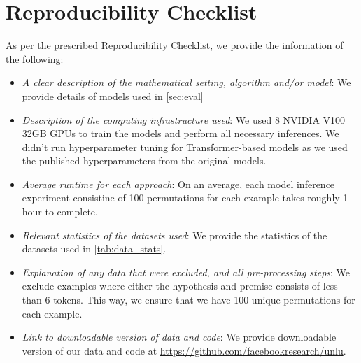 \documentclass[11pt,a4paper]{article}
\begin{document}
\begin{table}
\centering
{}
 \caption{Dataset statistics used in this paper for inference. `Used Examples' provides the number of premise-hypothesis pairs for the dataset which we selected for inference (i.e., examples where at least 100 unique permutations were possible).}
\label{tab:data_stats}
\end{table}


\section{Reproducibility Checklist}

As per the prescribed Reproducibility Checklist, we provide the information of the following:

\begin{itemize}
    \item \textit{A clear description of the mathematical setting, algorithm and/or model}: We provide details of models used in \autoref{sec:eval}
    \item \textit{Description of the computing infrastructure used}: We used 8 NVIDIA V100 32GB GPUs to train the models and perform all necessary inferences. We didn't run hyperparameter tuning for Transformer-based models as we used the published hyperparameters from the original models.
    \item \textit{Average runtime for each approach}: On an average, each model inference experiment consistine of 100 permutations for each example takes roughly 1 hour to complete.
    \item \textit{Relevant statistics of the datasets used}: We provide the statistics of the datasets used in \autoref{tab:data_stats}.
    \item \textit{Explanation of any data that were excluded, and all pre-processing steps}: We exclude examples where either the hypothesis and premise consists of less than 6 tokens. This way, we ensure that we have 100 unique permutations for each example.
    \item \textit{Link to downloadable version of data and code}: We provide downloadable version of our data and code at \href{https://github.com/facebookresearch/unlu}{https://github.com/facebookresearch/unlu}.
\end{itemize}
\end{document}
